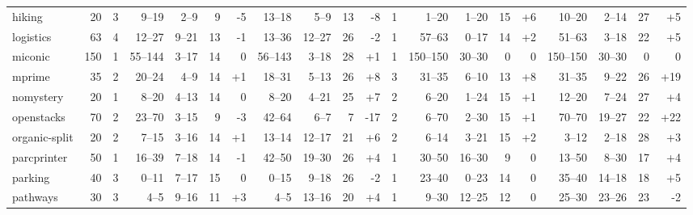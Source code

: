 \documentclass{article}
\begin{document}
\begin{table}
\begin{tabular}{l@{}rr|rrrr|rrrr|r|rrrr|rrrr}
        hiking &     20 &   3 &    9--19 &    2--9 &   9 &   {\color{red}-5} &   13--18 &    5--9 &  13 &    {\color{red}-8} &   1 &     1--20 &   1--20 &  15 &   {\color{blue}+6} &    10--20 &   2--14 &  27 &   {\color{blue}+5} \\
     logistics &     63 &   4 &   12--27 &   9--21 &  13 &   {\color{red}-1} &   13--36 &  12--27 &  26 &    {\color{red}-2} &   1 &    57--63 &   0--17 &  14 &   {\color{blue}+2} &    51--63 &   3--18 &  22 &   {\color{blue}+5} \\
       miconic &    150 &   1 &  55--144 &   3--17 &  14 &                 0 &  56--143 &   3--18 &  28 &   {\color{blue}+1} &   1 &  150--150 &  30--30 &   0 &                  0 &  150--150 &  30--30 &   0 &                  0 \\
        mprime &     35 &   2 &   20--24 &    4--9 &  14 &  {\color{blue}+1} &   18--31 &   5--13 &  26 &   {\color{blue}+8} &   3 &    31--35 &   6--10 &  13 &   {\color{blue}+8} &    31--35 &   9--22 &  26 &  {\color{blue}+19} \\
     nomystery &     20 &   1 &    8--20 &   4--13 &  14 &                 0 &    8--20 &   4--21 &  25 &   {\color{blue}+7} &   2 &     6--20 &   1--24 &  15 &   {\color{blue}+1} &    12--20 &   7--24 &  27 &   {\color{blue}+4} \\
    openstacks &     70 &   2 &   23--70 &   3--15 &   9 &   {\color{red}-3} &   42--64 &    6--7 &   7 &   {\color{red}-17} &   2 &     6--70 &   2--30 &  15 &   {\color{blue}+1} &    70--70 &  19--27 &  22 &  {\color{blue}+22} \\
 organic-split &     20 &   2 &    7--15 &   3--16 &  14 &  {\color{blue}+1} &   13--14 &  12--17 &  21 &   {\color{blue}+6} &   2 &     6--14 &   3--21 &  15 &   {\color{blue}+2} &     3--12 &   2--18 &  28 &   {\color{blue}+3} \\
   parcprinter &     50 &   1 &   16--39 &   7--18 &  14 &   {\color{red}-1} &   42--50 &  19--30 &  26 &   {\color{blue}+4} &   1 &    30--50 &  16--30 &   9 &                  0 &    13--50 &   8--30 &  17 &   {\color{blue}+4} \\
       parking &     40 &   3 &    0--11 &   7--17 &  15 &                 0 &    0--15 &   9--18 &  26 &    {\color{red}-2} &   1 &    23--40 &   0--23 &  14 &                  0 &    35--40 &  14--18 &  18 &   {\color{blue}+5} \\
      pathways &     30 &   3 &     4--5 &   9--16 &  11 &  {\color{blue}+3} &     4--5 &  13--16 &  20 &   {\color{blue}+4} &   1 &     9--30 &  12--25 &  12 &                  0 &    25--30 &  23--26 &  23 &    {\color{red}-2} \\

\end{tabular}
\end{table}
\end{document}
